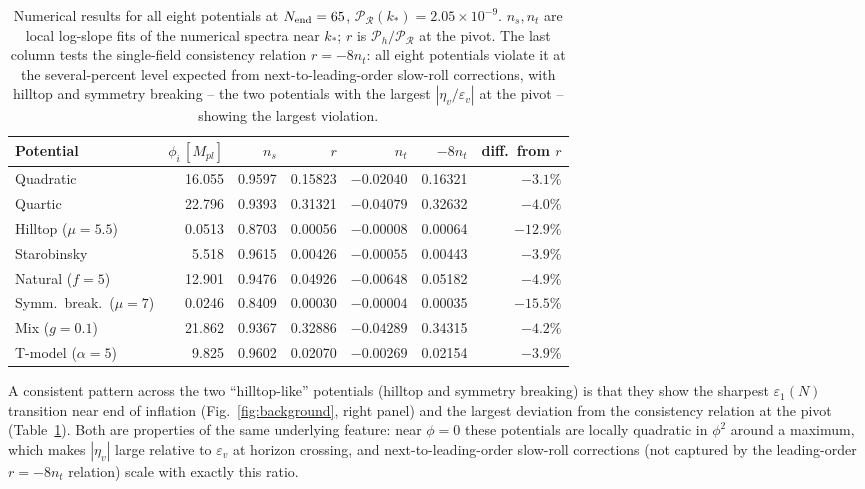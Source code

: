 \documentclass[11pt]{article}
\begin{document}
\begin{table}[htbp]
\centering
\small
\begin{tabular}{lrrrrrr}
\toprule
Potential & $\phi_i\,[M_{pl}]$ & $n_s$ & $r$ & $n_t$ & $-8n_t$ & diff.\ from $r$ \\
\midrule
Quadratic            & 16.055 & 0.9597 & 0.15823 & $-0.02040$ & 0.16321 & $-3.1\%$ \\
Quartic               & 22.796 & 0.9393 & 0.31321 & $-0.04079$ & 0.32632 & $-4.0\%$ \\
Hilltop ($\mu=5.5$)   & 0.0513 & 0.8703 & 0.00056 & $-0.00008$ & 0.00064 & $-12.9\%$ \\
Starobinsky           & 5.518  & 0.9615 & 0.00426 & $-0.00055$ & 0.00443 & $-3.9\%$ \\
Natural ($f=5$)       & 12.901 & 0.9476 & 0.04926 & $-0.00648$ & 0.05182 & $-4.9\%$ \\
Symm.\ break.\ ($\mu=7$)& 0.0246& 0.8409 & 0.00030 & $-0.00004$ & 0.00035 & $-15.5\%$ \\
Mix ($g=0.1$)         & 21.862 & 0.9367 & 0.32886 & $-0.04289$ & 0.34315 & $-4.2\%$ \\
T-model ($\alpha=5$)  & 9.825  & 0.9602 & 0.02070 & $-0.00269$ & 0.02154 & $-3.9\%$ \\
\bottomrule
\end{tabular}
\caption{Numerical results for all eight potentials at $N_{\rm end}=65$,
$\mathcal{P}_\mathcal{R}(k_*)=2.05\times10^{-9}$. $n_s,n_t$ are local log-slope fits of
the numerical spectra near $k_*$; $r$ is $\mathcal{P}_h/\mathcal{P}_\mathcal{R}$ at the
pivot. The last column tests the single-field consistency relation $r=-8n_t$: all eight
potentials violate it at the several-percent level expected from next-to-leading-order
slow-roll corrections, with hilltop and symmetry breaking -- the two potentials with the
largest $|\eta_v/\varepsilon_v|$ at the pivot -- showing the largest violation.}
\label{tab:main}
\end{table}

A consistent pattern across the two ``hilltop-like'' potentials (hilltop and symmetry
breaking) is that they show the sharpest $\varepsilon_1(N)$ transition near end of
inflation (Fig.~\ref{fig:background}, right panel) and the largest deviation from the
consistency relation at the pivot (Table~\ref{tab:main}). Both are properties of the
same underlying feature: near $\phi=0$ these potentials are locally quadratic in $\phi^2$
around a maximum, which makes $|\eta_v|$ large relative to $\varepsilon_v$ at horizon
crossing, and next-to-leading-order slow-roll corrections (not captured by the
leading-order $r=-8n_t$ relation) scale with exactly this ratio.
\end{document}
